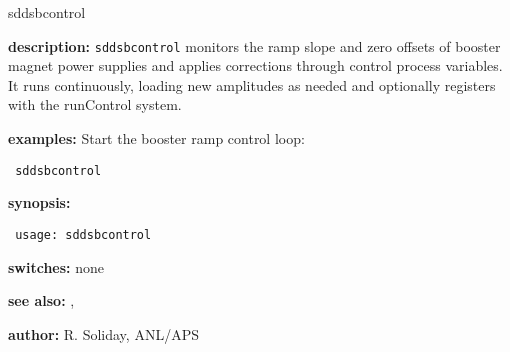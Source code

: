 %
\begin{sddsprog}{sddsbcontrol}
\item \textbf{description:}
\verb+sddsbcontrol+ monitors the ramp slope and zero offsets of booster magnet power supplies and applies corrections through control process variables. It runs continuously, loading new amplitudes as needed and optionally registers with the runControl system.

\item \textbf{examples:}
Start the booster ramp control loop:
\begin{flushleft}{\tt
sddsbcontrol\\
}\end{flushleft}

\item \textbf{synopsis:}
\begin{flushleft}{\tt
usage: sddsbcontrol\\
}\end{flushleft}

\item \textbf{switches:} none

\item \textbf{see also:} , 

\item \textbf{author:} R. Soliday, ANL/APS
\end{sddsprog}
